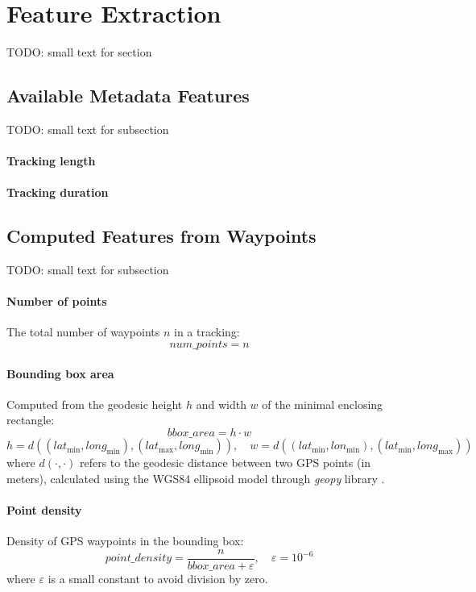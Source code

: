 \documentclass[a4paper,12pt,twoside]{scrreprt}
\begin{document}
\section{Feature Extraction}
TODO: small text for section

\subsection{Available Metadata Features}
TODO: small text for subsection

\paragraph{Tracking length}

\paragraph{Tracking duration}

\subsection{Computed Features from Waypoints}
TODO: small text for subsection

\paragraph{Number of points}

The total number of waypoints $n$ in a tracking:
\[
  num\_points = n
\]

\paragraph{Bounding box area}

Computed from the geodesic height $h$ and width $w$ of the minimal enclosing
rectangle:
\[
  bbox\_area = h \cdot w
\]
\[
  h = d((lat_{\min}, long_{\min}), (lat_{\max}, long_{\min})), \quad w =
  d((lat_{\min}, lon_{\min}), (lat_{\min}, long_{\max}))
\]
where $d(\cdot, \cdot)$ refers to the geodesic distance between two GPS points
(in
meters), calculated using the WGS84 ellipsoid model through \textit{geopy}
library
\cite{noauthor_welcome_nodate}.

\paragraph{Point density}

Density of GPS waypoints in the bounding box:
\[
  point\_density = \frac{n}{bbox\_area + \varepsilon}, \quad
  \varepsilon = 10^{-6}
\]
where $\varepsilon$ is a small constant to avoid division by zero.
\end{document}
